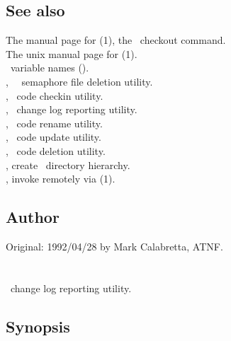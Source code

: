 \subsection*{See also}

The manual page for (1), the \rcs\ checkout command.\\
The unix manual page for (1).\\
\aipspp\ variable names ().\\
, \aipspp\ \rcs\ semaphore file deletion utility.\\
, \aipspp\ code checkin utility.\\
, \aipspp\ change log reporting utility.\\
, \aipspp\ code rename utility.\\
, \aipspp\ code update utility.\\
, \aipspp\ code deletion utility.\\
, create \aipspp\ directory hierarchy.\\
, invoke  remotely via (1).

\subsection*{Author}

Original: 1992/04/28 by Mark Calabretta, ATNF.


\newpage
\section{}
\label{alog}

\aipspp\ change log reporting utility.

\subsection*{Synopsis}

\begin{synopsis}
\end{synopsis}


